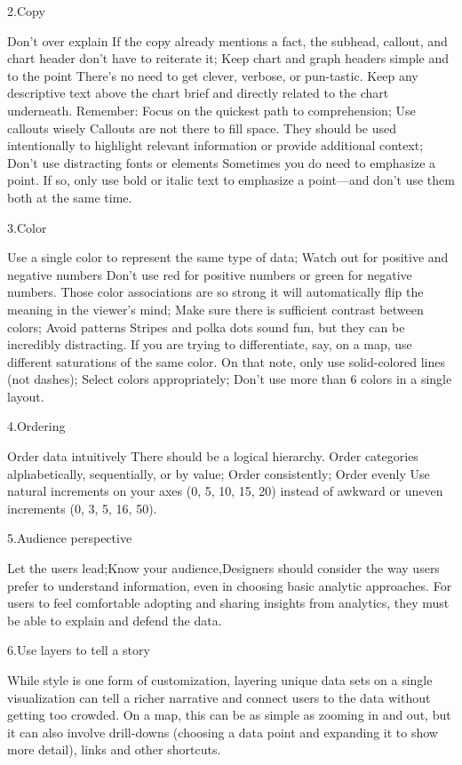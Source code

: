 \documentclass[]{book}
\theoremstyle{definition}
\theoremstyle{definition}
\theoremstyle{definition}
\theoremstyle{remark}
\begin{document}
2.Copy

Don't over explain If the copy already mentions a fact, the subhead,
callout, and chart header don't have to reiterate it; Keep chart and
graph headers simple and to the point There's no need to get clever,
verbose, or pun-tastic. Keep any descriptive text above the chart brief
and directly related to the chart underneath. Remember: Focus on the
quickest path to comprehension; Use callouts wisely Callouts are not
there to fill space. They should be used intentionally to highlight
relevant information or provide additional context; Don't use
distracting fonts or elements Sometimes you do need to emphasize a
point. If so, only use bold or italic text to emphasize a point---and
don't use them both at the same time.

3.Color

Use a single color to represent the same type of data; Watch out for
positive and negative numbers Don't use red for positive numbers or
green for negative numbers. Those color associations are so strong it
will automatically flip the meaning in the viewer's mind; Make sure
there is sufficient contrast between colors; Avoid patterns Stripes and
polka dots sound fun, but they can be incredibly distracting. If you are
trying to differentiate, say, on a map, use different saturations of the
same color. On that note, only use solid-colored lines (not dashes);
Select colors appropriately; Don't use more than 6 colors in a single
layout.

4.Ordering

Order data intuitively There should be a logical hierarchy. Order
categories alphabetically, sequentially, or by value; Order
consistently; Order evenly Use natural increments on your axes (0, 5,
10, 15, 20) instead of awkward or uneven increments (0, 3, 5, 16, 50).

5.Audience perspective

Let the users lead;Know your audience,Designers should consider the way
users prefer to understand information, even in choosing basic analytic
approaches. For users to feel comfortable adopting and sharing insights
from analytics, they must be able to explain and defend the data.

6.Use layers to tell a story

While style is one form of customization, layering unique data sets on a
single visualization can tell a richer narrative and connect users to
the data without getting too crowded. On a map, this can be as simple as
zooming in and out, but it can also involve drill-downs (choosing a data
point and expanding it to show more detail), links and other shortcuts.
\end{document}
